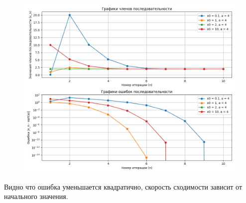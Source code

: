 \documentclass{report}
\begin{document}
\begin{enumerate}
\begin{figure}[H]
\begin{center}
		\includegraphics[scale=0.5]{1.png}
	\end{center}
\end{figure}
Видно что ошибка уменьшается квадратично, скорость сходимости зависит от начального значения.
\end{enumerate}
\end{document}
